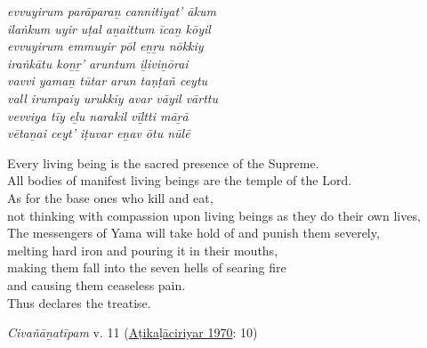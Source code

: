 \begin{pullquote}\raggedright
      \emph{evvuyirum parāparaṉ cannitiyat’ ākum}\\
\emph{ilaṅkum uyir uṭal aṉaittum īcaṉ kōyil}\\
\emph{evvuyirum emmuyir pōl eṉṟu nōkkiy}\\
\emph{iraṅkātu koṉṟ’ aruntum iḻiviṉōrai}\\
\emph{vavvi yamaṉ tūtar arun taṇṭañ ceytu}\\
\emph{vall irumpaiy urukkiy avar vāyil vārttu}\\
\emph{vevviya tīy eḻu narakil vīḻtti māṟā}\\
\emph{vētaṉai ceyt’ iṭuvar eṉav ōtu nūlē}
\end{pullquote}
      
\begin{pullquote}


	
	    Every living being is the sacred presence of the Supreme.\\
	    All bodies of manifest living beings are the temple of the Lord.\\
	    As for the base ones who kill and eat,\\
	    not thinking with compassion upon living beings as they do their own lives,\\
	    The messengers of Yama will take hold of and punish them severely,\\
	    melting hard iron and pouring it in their mouths,\\
	    making them fall into the seven hells of searing fire\\
	    and causing them ceaseless pain.\\
	    Thus declares the treatise. 
	  

\medskip\hfill\begin{minipage}{0.9\textwidth}\small\hfill
\emph{Civañāṉatīpam} v. 11 (\hyperref[Atikalaciriyar1970]{Aṭikaḷāciriyar 1970}: 10)\end{minipage}\hspace{2em}
\end{pullquote}

